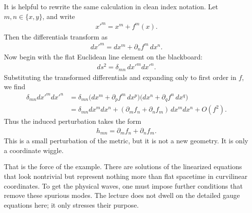 It is helpful to rewrite the same calculation in clean index notation. Let \(m,n\in\{x,y\}\), and write
\begin{align}
x'^m=x^m+f^m(x).
\end{align}
Then the differentials transform as
\begin{align}
dx'^m=dx^m+\partial_n f^m\,dx^n.
\end{align}
Now begin with the flat Euclidean line element on the blackboard:
\begin{align}
ds^2=\delta_{mn}\,dx'^m dx'^n.
\end{align}
Substituting the transformed differentials and expanding only to first order in \(f\), we find
\begin{align}
\delta_{mn}dx'^m dx'^n
&=
\delta_{mn}
\bigl(dx^m+\partial_p f^m\,dx^p\bigr)
\bigl(dx^n+\partial_q f^n\,dx^q\bigr)\\
&=
\delta_{mn}dx^m dx^n
+
(\partial_m f_n+\partial_n f_m)\,dx^m dx^n
+
O(f^2).
\end{align}
Thus the induced perturbation takes the form
\begin{align}
h_{mn}=\partial_m f_n+\partial_n f_m.
\end{align}
This is a small perturbation of the metric, but it is not a new geometry. It is only a coordinate wiggle.

That is the force of the example. There are solutions of the linearized equations that look nontrivial but represent nothing more than flat spacetime in curvilinear coordinates. To get the physical waves, one must impose further conditions that remove these spurious modes. The lecture does not dwell on the detailed gauge equations here; it only stresses their purpose.

